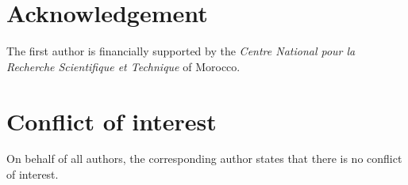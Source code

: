 \documentclass[a4paper,12pt]{article}
\theoremstyle{plain}
\theoremstyle{definition}
\theoremstyle{remark}
\begin{document}
\section*{Acknowledgement}
The first author is financially supported by the \textit{Centre National pour la Recherche Scientifique et Technique} of Morocco.

\section*{Conflict of interest}
On behalf of all authors, the corresponding author states that there is no conflict of interest.


\nocite{*}



\end{document}
